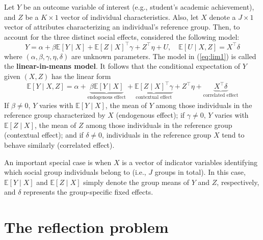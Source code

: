 \documentclass[10.5pt, A4paper, openany, uplatex]{book}
\newcommand{\E}{\mathbb{E}}
\numberwithin{equation}{section}
\begin{document}
Let $Y$ be an outcome variable of interest (e.g., student's academic achievement), and $Z$ be a $K \times 1$ vector of individual characteristics. Also, let $X$ denote a $J \times 1$ vector of attributes characterizing an individual's reference group. Then, to account for the three distinct social effects, \cite{manski1993identification} considered the following model:
\begin{equation}\label{eq:lim1}
	Y = \alpha + \beta \E[Y \mid X] + \E[Z \mid X]^\top \gamma + Z^\top \eta + U, \quad \E[U \mid X, Z] = X^\top \delta 
\end{equation}
where $(\alpha, \beta, \gamma, \eta, \delta)$ are unknown parameters. The model in (\ref{eq:lim1}) is called the \textbf{linear-in-means model}. It follows that the conditional expectation of $Y$ given $(X, Z)$ has the linear form
\begin{equation}\label{eq:lim2}
	\E[ Y \mid X, Z] = \alpha + \underbrace{\beta \E[Y \mid X]}_{\text{endogenous effect}} + \underbrace{\E[Z \mid X]^\top \gamma}_{\text{contextual effect}} + Z^\top \eta + \underbrace{X^\top \delta}_{\text{correlated effect}}
\end{equation}
If $\beta \neq 0$, $Y$ varies with $\E[Y \mid X]$, the mean of $Y$ among those individuals in the reference group characterized by $X$ (endogenous effect); if $\gamma \neq 0$, $Y$ varies with $\E[Z \mid X]$, the mean of $Z$ among those individuals in the reference group (contextual effect); and if $\delta \neq 0$, individuals in the reference group $X$ tend to behave similarly (correlated effect).

An important special case is when $X$ is a vector of indicator variables identifying which social group individuals belong to (i.e., $J$ groups in total). In this case, $\E[Y \mid X]$ and $\E[Z \mid X]$ simply denote the group means of $Y$ and $Z$, respectively, and $\delta$ represents the group-specific fixed effects.

\section{The reflection problem}
\end{document}
